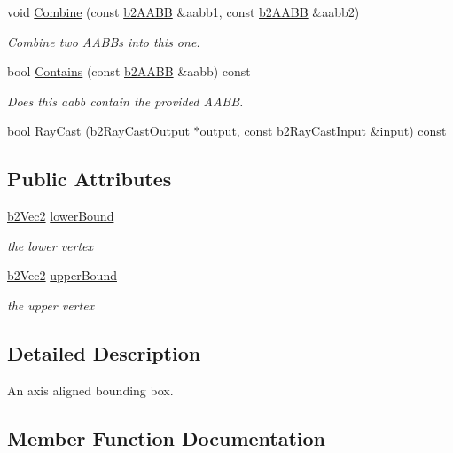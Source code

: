 \begin{DoxyCompactItemize}
void \mbox{\hyperlink{structb2_a_a_b_b_a34b9c7d824df845c10caa9c12ae90452}{Combine}} (const \mbox{\hyperlink{structb2_a_a_b_b}{b2\+A\+A\+BB}} \&aabb1, const \mbox{\hyperlink{structb2_a_a_b_b}{b2\+A\+A\+BB}} \&aabb2)
\begin{DoxyCompactList}\small\item\em Combine two A\+A\+B\+Bs into this one. \end{DoxyCompactList}\item 
bool \mbox{\hyperlink{structb2_a_a_b_b_acf98175d3a53bca755d5c4852fa85a00}{Contains}} (const \mbox{\hyperlink{structb2_a_a_b_b}{b2\+A\+A\+BB}} \&aabb) const
\begin{DoxyCompactList}\small\item\em Does this aabb contain the provided A\+A\+BB. \end{DoxyCompactList}\item 
bool \mbox{\hyperlink{structb2_a_a_b_b_af6a8b26716ec07d326e5ce95556e8c7e}{Ray\+Cast}} (\mbox{\hyperlink{structb2_ray_cast_output}{b2\+Ray\+Cast\+Output}} $\ast$output, const \mbox{\hyperlink{structb2_ray_cast_input}{b2\+Ray\+Cast\+Input}} \&input) const
\end{DoxyCompactItemize}
\subsection*{Public Attributes}
\begin{DoxyCompactItemize}
\item 
\mbox{\hyperlink{structb2_vec2}{b2\+Vec2}} \mbox{\hyperlink{structb2_a_a_b_b_ab94b68fbad8348b22b0522469b11bdb5}{lower\+Bound}}
\begin{DoxyCompactList}\small\item\em the lower vertex \end{DoxyCompactList}\item 
\mbox{\hyperlink{structb2_vec2}{b2\+Vec2}} \mbox{\hyperlink{structb2_a_a_b_b_ad4a8ec483ba13a2c02918b01d058a18f}{upper\+Bound}}
\begin{DoxyCompactList}\small\item\em the upper vertex \end{DoxyCompactList}\end{DoxyCompactItemize}


\subsection{Detailed Description}
An axis aligned bounding box. 

\subsection{Member Function Documentation}
\mbox{\label{structb2_a_a_b_b_ad551edba62d2ad6094672a9ba3e26496}} 
